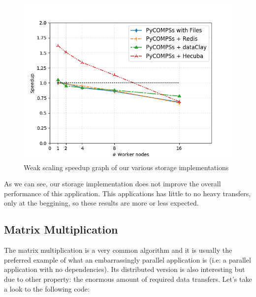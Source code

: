 \begin{figure}[ht!]
\centering
\includegraphics[scale = 0.5]{figures/storage/kmeans_weak_speedup.png}
\caption{Weak scaling speedup graph of our various storage implementations}
\label{fig:kmeans_weak_speedup_redis}
\end{figure}

As we can see, our storage implementation does not improve the overall performance of this application. This applications has little to no heavy transfers, only at the beggining, so these results are more or less expected.


\subsection{Matrix Multiplication}
\label{subsubsec:matmul_redis}
The matrix multiplication is a very common algorithm and it is usually the preferred example of what an embarrassingly parallel application is (i.e: a parallel application with no dependencies). Its distributed version is also interesting but due to other property: the enormous amount of required data transfers. Let's take a look to the following code:

\inputminted{python}{snippets/matmul_python.py}


